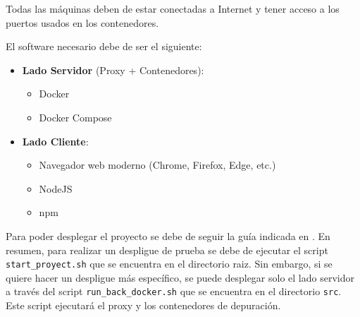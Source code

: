 Todas las máquinas deben de estar conectadas a Internet y tener acceso a los puertos usados en los contenedores. 

El software necesario debe de ser el siguiente:
\begin{itemize}
    \item \textbf{Lado Servidor} (Proxy + Contenedores):
    \begin{itemize}
        \item Docker
        \item Docker Compose
    \end{itemize}
    \item \textbf{Lado Cliente}:
    \begin{itemize}
        \item Navegador web moderno (Chrome, Firefox, Edge, etc.)
        \item NodeJS
        \item npm
    \end{itemize}   
\end{itemize}

Para poder desplegar el proyecto se debe de seguir la guía indicada en .
En resumen, para realizar un despligue de prueba se debe de ejecutar el script \texttt{start\_proyect.sh} que se encuentra en el directorio raiz. Sin embargo, si se quiere hacer un despligue más específico, se puede desplegar solo el lado servidor a través del script \texttt{run\_back\_docker.sh} que se encuentra en el directorio \texttt{src}. Este script ejecutará el proxy y los contenedores de depuración.